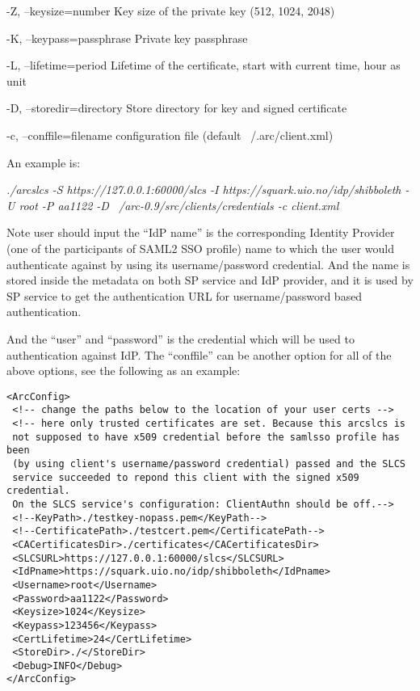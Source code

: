 \documentclass{book}
\begin{document}
  -Z, --keysize=number         Key size of the private key (512, 1024, 2048) 

  -K, --keypass=passphrase     Private key passphrase 

  -L, --lifetime=period        Lifetime of the certificate, start with current time, hour as unit 

  -D, --storedir=directory     Store directory for key and signed certificate

  -c, --conffile=filename      configuration file (default ~/.arc/client.xml) 

An example is:

\textit{./arcslcs -S https://127.0.0.1:60000/slcs -I https://squark.uio.no/idp/shibboleth -U root -P aa1122 -D   ~/arc-0.9/src/clients/credentials -c client.xml}

    Note user should input the ``IdP name'' is the corresponding Identity Provider (one of the participants of SAML2 SSO profile) name to which the user would authenticate against by using its username/password credential. And the name is stored inside the metadata on both SP service and IdP provider, and it is used by SP service to get the authentication URL for username/password based authentication.

    And the ``user'' and ``password'' is the credential which will be used to authentication against IdP.
The ``conffile'' can be another option for all of the above options, see the following as an example:

\begin{verbatim}
<ArcConfig> 
 <!-- change the paths below to the location of your user certs --> 
 <!-- here only trusted certificates are set. Because this arcslcs is 
 not supposed to have x509 credential before the samlsso profile has been 
 (by using client's username/password credential) passed and the SLCS 
 service succeeded to repond this client with the signed x509 credential. 
 On the SLCS service's configuration: ClientAuthn should be off.--> 
 <!--KeyPath>./testkey-nopass.pem</KeyPath--> 
 <!--CertificatePath>./testcert.pem</CertificatePath--> 
 <CACertificatesDir>./certificates</CACertificatesDir> 
 <SLCSURL>https://127.0.0.1:60000/slcs</SLCSURL> 
 <IdPname>https://squark.uio.no/idp/shibboleth</IdPname> 
 <Username>root</Username> 
 <Password>aa1122</Password> 
 <Keysize>1024</Keysize> 
 <Keypass>123456</Keypass> 
 <CertLifetime>24</CertLifetime> 
 <StoreDir>./</StoreDir> 
 <Debug>INFO</Debug> 
</ArcConfig> 
\end{verbatim}
\end{document}
